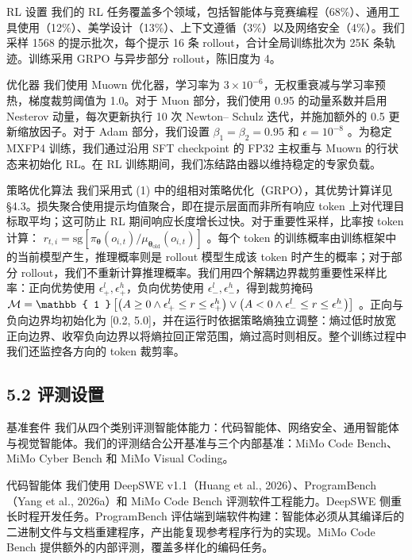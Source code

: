 RL 设置 我们的 RL 任务覆盖多个领域，包括智能体与竞赛编程（68\%）、通用工具使用（12\%）、美学设计（13\%）、上下文遵循（3\%）以及网络安全（4\%）。我们采样 1568 的提示批次，每个提示 16 条 rollout，合计全局训练批次为 25K 条轨迹。训练采用 GRPO 与异步部分 rollout，陈旧度为 4。

优化器 我们使用 Muown 优化器，学习率为 \(3 \times 1 0 ^ { - 6 }\)，无权重衰减与学习率预热，梯度裁剪阈值为 1.0。对于 Muon 部分，我们使用 0.95 的动量系数并启用 Nesterov 动量，每次更新执行 10 次 Newton-- Schulz 迭代，并施加额外的 0.5 更新缩放因子。对于 Adam 部分，我们设置
\(\beta _ { 1 } = \beta _ { 2 } = 0 . 9 5\) 和
\(\epsilon = 1 0 ^ { - 8 }\) 。为稳定 MXFP4 训练，我们通过沿用 SFT checkpoint 的 FP32 主权重与 Muown 的行状态来初始化 RL。在 RL 训练期间，我们冻结路由器以维持稳定的专家负载。



策略优化算法 我们采用式 (1) 中的组相对策略优化（GRPO），其优势计算详见 §4.3。损失聚合使用提示均值聚合，即在提示层面而非所有响应 token 上对代理目标取平均；这可防止 RL 期间响应长度增长过快。对于重要性采样，比率按 token 计算：
\(r _ { t , i } = \mathrm { s g } [ \pi _ { \boldsymbol { \theta } } ( o _ { i , t } ) / \mu _ { \boldsymbol { \theta } _ { \mathrm { o l d } } } ( o _ { i , t } ) ]\)
。每个 token 的训练概率由训练框架中的当前模型产生，推理概率则是 rollout 模型生成该 token 时产生的概率；对于部分 rollout，我们不重新计算推理概率。我们用四个解耦边界裁剪重要性采样比率：正向优势使用
\(\epsilon _ { + } ^ { l } , \epsilon _ { + } ^ { h }\)，负向优势使用 \(\epsilon _ { - } ^ { l } , \epsilon _ { - } ^ { h }\)，得到裁剪掩码
\({ \cal M } = \mathbb { 1 } \left[ \big ( A \ge 0 \land \epsilon _ { + } ^ { l } \le r \le \epsilon _ { + } ^ { h } \big ) \lor \big ( A < 0 \land \epsilon _ { - } ^ { l } \le r \le \epsilon _ { - } ^ { h } \big ) \right]\)
。正向与负向边界均初始化为 {[}0.2, 5.0{]}，并在运行时依据策略熵独立调整：熵过低时放宽正向边界、收窄负向边界以将熵拉回正常范围，熵过高时则相反。整个训练过程中我们还监控各方向的 token 裁剪率。

\subsection{5.2 评测设置}\label{evaluation-settings}

基准套件 我们从四个类别评测智能体能力：代码智能体、网络安全、通用智能体与视觉智能体。我们的评测结合公开基准与三个内部基准：MiMo Code Bench、MiMo Cyber Bench 和 MiMo Visual Coding。

代码智能体 我们使用 DeepSWE v1.1（Huang et al., 2026）、ProgramBench（Yang et al., 2026a）和 MiMo Code Bench 评测软件工程能力。DeepSWE 侧重长时程开发任务。ProgramBench 评估端到端软件构建：智能体必须从其编译后的二进制文件与文档重建程序，产出能复现参考程序行为的实现。MiMo Code Bench 提供额外的内部评测，覆盖多样化的编码任务。

